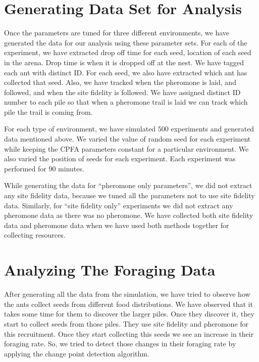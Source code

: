 \section{\label{section:Generating Data Set for Analysis}Generating Data Set for Analysis}
 Once the parameters are tuned for three different environments, we have generated the data for our analysis using these parameter sets. For each of the experiment, we have extracted drop off time for each seed, location of each seed in the arena. Drop time is when it is dropped off at the nest. We have tagged each ant with distinct ID. For each seed, we also have extracted which ant has collected that seed. Also, we have tracked when the pheromone is laid, and followed, and when the site fidelity is followed. We have assigned distinct ID number to each pile so that when a pheromone trail is laid we can track which pile the trail is coming from.\par
 For each type of environment, we have simulated $500$ experiments and generated data mentioned above. We varied the value of random seed for each experiment while keeping the CPFA parameters constant for a particular environment. We also varied the position of seeds for each experiment. Each experiment was performed for $90$ minutes.\par 
 While generating the data for ``pheromone only parameters'', we did not extract any site fidelity data, because we tuned all the parameters not to use site fidelity data. Similarly, for ``site fidelity only'' experiments we did not extract any pheromone data as there was no pheromone. We have collected both site fidelity data and pheromone data when we have used both methods together for collecting resources.
 \section{\label{Analyzing The Foraging Data}Analyzing The Foraging Data}
 After generating all the data from the simulation, we have tried to observe how the ants collect seeds from different food distributions. We have observed that it takes some time for them to discover the larger piles. Once they discover it, they start to collect seeds from those piles. They use site fidelity and pheromone for this recruitment. Once they start collecting this seeds we see an increase in their foraging rate. So, we tried to detect those changes in their foraging rate by applying the change point detection algorithm. 
